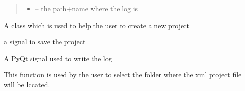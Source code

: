 \documentclass[letterpaper,10pt,english]{sphinxmanual}
\begin{document}
\begin{fulllineitems}
\begin{fulllineitems}
\begin{quote}
\begin{description}
\begin{itemize}
\item {} 
 -- the path+name where the log is

\end{itemize}

\end{description}\end{quote}

\end{fulllineitems}


\end{fulllineitems}


\begin{fulllineitems}
\label{\detokenize{index:src_GUI.Main_windows_1.CreateNewProjectDialog}}
A class which is used to help the user to create a new project

\begin{fulllineitems}
\label{\detokenize{index:src_GUI.Main_windows_1.CreateNewProjectDialog.init_iu}}
\end{fulllineitems}


\begin{fulllineitems}
\label{\detokenize{index:src_GUI.Main_windows_1.CreateNewProjectDialog.save_project}}
a signal to save the project

\end{fulllineitems}


\begin{fulllineitems}
\label{\detokenize{index:src_GUI.Main_windows_1.CreateNewProjectDialog.send_log}}
A PyQt signal used to write the log

\end{fulllineitems}


\begin{fulllineitems}
\label{\detokenize{index:src_GUI.Main_windows_1.CreateNewProjectDialog.setfolder}}
This function is used by the user to select the folder where the xml project file will be located.

\end{fulllineitems}


\end{fulllineitems}
\end{document}
